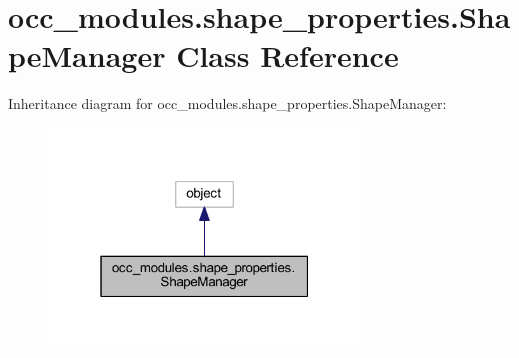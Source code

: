\hypertarget{a00095}{}\section{occ\+\_\+modules.\+shape\+\_\+properties.\+Shape\+Manager Class Reference}
\label{a00095}


Inheritance diagram for occ\+\_\+modules.\+shape\+\_\+properties.\+Shape\+Manager\+:
\nopagebreak
\begin{figure}[H]
\begin{center}
\leavevmode
\includegraphics[width=235pt]{a00094}
\end{center}
\end{figure}
